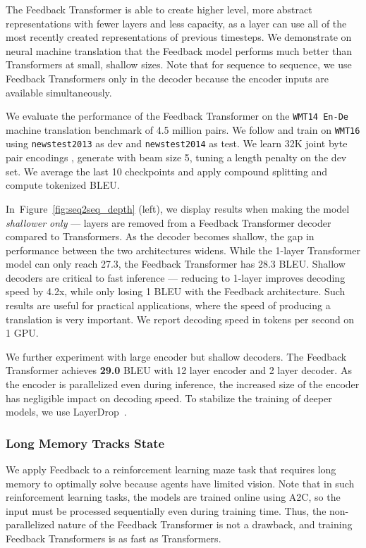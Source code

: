\documentclass{article} \usepackage{iclr2021_conference}
\newcommand{\fig}[1]{Figure~\ref{fig:#1}}
\begin{document}
The Feedback Transformer is able to create higher level, more abstract representations with fewer layers and less capacity, as a layer can use all of the most recently created representations of previous timesteps. We demonstrate on neural machine translation that the Feedback model performs much better than Transformers at small, shallow sizes. Note that for sequence to sequence, we use Feedback Transformers only in the decoder because the encoder inputs are available simultaneously. 

We evaluate the performance of the Feedback Transformer on the \texttt{WMT14 En-De} machine translation benchmark of 4.5 million pairs.
We follow \cite{vaswani2017attention} and train on \texttt{WMT16} using \texttt{newstest2013} as dev and \texttt{newstest2014} as test. 
We learn 32K joint byte pair encodings \citep{sennrich2015neural}, generate with beam size 5, tuning a length penalty on the dev set.
We average the last 10 checkpoints and apply compound splitting and compute tokenized BLEU.

In~\fig{seq2seq_depth} (left), we display results when making the model \textit{shallower only} --- layers are removed from a Feedback Transformer decoder compared to Transformers. 
As the decoder becomes shallow, the gap in performance between the two architectures widens. 
While the 1-layer Transformer model can only reach 27.3, the Feedback Transformer has 28.3 BLEU. Shallow decoders are critical to fast inference --- reducing to 1-layer improves decoding speed by 4.2x, while only losing 1 BLEU with the Feedback architecture. Such results are useful for practical applications, where the speed of producing a translation is very important.
We report decoding speed in tokens per second on 1 GPU. 

We further experiment with large encoder but shallow decoders. The Feedback Transformer achieves \textbf{29.0} BLEU with 12 layer encoder and 2 layer decoder. As the encoder is parallelized even during inference, the increased size of the encoder has negligible impact on decoding speed. To stabilize the training of deeper models, we use LayerDrop~\citep{fan2019reducing}.

\subsubsection{Long Memory Tracks State}



We apply Feedback to a reinforcement learning maze task that requires long memory to optimally solve because agents have limited vision.
Note that in such reinforcement learning tasks, the models are trained online using A2C, so the input must be processed sequentially even during training time. Thus, the non-parallelized nature of the Feedback Transformer is not a drawback, and training Feedback Transformers is as fast as Transformers. 
\end{document}
